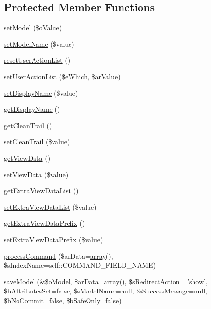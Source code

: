 \subsection*{Protected Member Functions}
\begin{DoxyCompactItemize}
\item 
\hyperlink{classCPSController_adfc5ef703eac3b48de3d2f81d8de6b14}{setModel} (\$oValue)
\item 
\hyperlink{classCPSController_a176dfa82642f33d337898c51f4bcd01e}{setModelName} (\$value)
\item 
\hyperlink{classCPSController_a31c904e5fb114fc2dbaa9363859b0655}{resetUserActionList} ()
\item 
\hyperlink{classCPSController_aee2a89d58ba7ecfae1b0a6e5fa43c992}{setUserActionList} (\$eWhich, \$arValue)
\item 
\hyperlink{classCPSController_abe464c0e9916ca43403a649587875804}{setDisplayName} (\$value)
\item 
\hyperlink{classCPSController_a273f6220e7dea1423919139742e04902}{getDisplayName} ()
\item 
\hyperlink{classCPSController_ae3221c17c6defb911162b50823032f36}{getCleanTrail} ()
\item 
\hyperlink{classCPSController_ac4bc10f13ac2c2b7a97b2dc3dea3155a}{setCleanTrail} (\$value)
\item 
\hyperlink{classCPSController_a09cb66dd061fa338ab2a85a31f5ccf00}{getViewData} ()
\item 
\hyperlink{classCPSController_ade714d0b090e663e7acd6ef596d602ec}{setViewData} (\$value)
\item 
\hyperlink{classCPSController_a095ad5a2da0a46cf0c5225c826b7fe4c}{getExtraViewDataList} ()
\item 
\hyperlink{classCPSController_a537201d018053eaff662e290be1a8a81}{setExtraViewDataList} (\$value)
\item 
\hyperlink{classCPSController_a1f4c82d1446cb4a49f0da9bc76e5aa1e}{getExtraViewDataPrefix} ()
\item 
\hyperlink{classCPSController_ae80dd653d6c5d9e7be65cd7ae3f05627}{setExtraViewDataPrefix} (\$value)
\item 
\hyperlink{classCPSController_ae4991b44dadced9ed4c2548c8a52b72e}{processCommand} (\$arData=\hyperlink{list_8php_aa3205d038c7f8feb5c9f01ac4dfadc88}{array}(), \$sIndexName=self::COMMAND\_\-FIELD\_\-NAME)
\item 
\hyperlink{classCPSController_a2c9d1571a7e74596a369bfe9601b25fc}{saveModel} (\&\$oModel, \$arData=\hyperlink{list_8php_aa3205d038c7f8feb5c9f01ac4dfadc88}{array}(), \$sRedirectAction= 'show', \$bAttributesSet=false, \$sModelName=null, \$sSuccessMessage=null, \$bNoCommit=false, \$bSafeOnly=false)

\end{DoxyCompactItemize}
